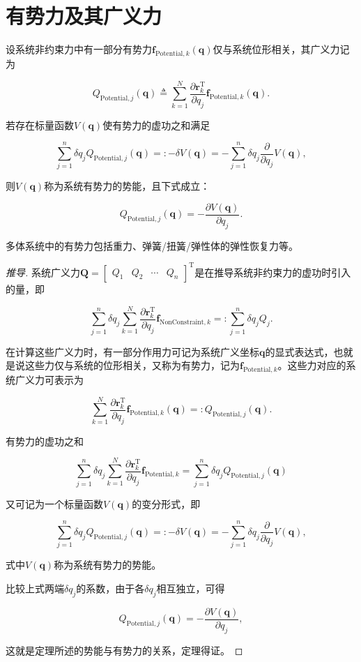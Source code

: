\section{有势力及其广义力}
\begin{theorem}[势能与有势力的关系]
设系统非约束力中有一部分有势力$\boldsymbol{f}_{\text{Potential},k}(\boldsymbol{q})$仅与系统位形相关，其广义力记为

\[
Q_{\text{Potential},j}(\boldsymbol{q}) \triangleq \sum_{k=1}^{N}\frac{\partial \boldsymbol{r}_k^{\mathrm{T}}}{\partial q_j}\boldsymbol{f}_{\text{Potential},k}(\boldsymbol{q}).
\]

若存在标量函数$V(\boldsymbol{q})$使有势力的虚功之和满足

\[
\sum_{j=1}^{n}\delta q_j Q_{\text{Potential},j}(\boldsymbol{q}) =: -\delta V(\boldsymbol{q}) = -\sum_{j=1}^{n}\delta q_j\frac{\partial}{\partial q_j}V(\boldsymbol{q}),
\]

则$V(\boldsymbol{q})$称为系统有势力的势能，且下式成立：

\[
Q_{\text{Potential},j}(\boldsymbol{q}) = -\frac{\partial V(\boldsymbol{q})}{\partial q_j}.
\]

多体系统中的有势力包括重力、弹簧/扭簧/弹性体的弹性恢复力等。
\end{theorem}
\begin{proof}[推导]
系统广义力$\boldsymbol{Q} = \begin{bmatrix}Q_1 & Q_2 & \cdots & Q_n\end{bmatrix}^{\mathrm{T}}$是在推导系统非约束力的虚功时引入的量，即

\[
\sum_{j=1}^{n}\delta q_j\sum_{k=1}^{N}\frac{\partial \boldsymbol{r}_k^{\mathrm{T}}}{\partial q_j}\boldsymbol{f}_{\text{NonConstraint},k} =: \sum_{j=1}^{n}\delta q_j Q_j.
\]

在计算这些广义力时，有一部分作用力可记为系统广义坐标$\boldsymbol{q}$的显式表达式，也就是说这些力仅与系统的位形相关，又称为有势力，记为$\boldsymbol{f}_{\text{Potential},k}$。这些力对应的系统广义力可表示为

\[
\sum_{k=1}^{N}\frac{\partial \boldsymbol{r}_k^{\mathrm{T}}}{\partial q_j}\boldsymbol{f}_{\text{Potential},k}(\boldsymbol{q}) =: Q_{\text{Potential},j}(\boldsymbol{q}).
\]

有势力的虚功之和

\[
\sum_{j=1}^{n}\delta q_j\sum_{k=1}^{N}\frac{\partial \boldsymbol{r}_k^{\mathrm{T}}}{\partial q_j}\boldsymbol{f}_{\text{Potential},k} = \sum_{j=1}^{n}\delta q_j Q_{\text{Potential},j}(\boldsymbol{q})
\]

又可记为一个标量函数$V(\boldsymbol{q})$的变分形式，即

\[
\sum_{j=1}^{n}\delta q_j Q_{\text{Potential},j}(\boldsymbol{q}) =: -\delta V(\boldsymbol{q}) = -\sum_{j=1}^{n}\delta q_j\frac{\partial}{\partial q_j}V(\boldsymbol{q}),
\]

式中$V(\boldsymbol{q})$称为系统有势力的势能。

比较上式两端$\delta q_j$的系数，由于各$\delta q_j$相互独立，可得

\[
Q_{\text{Potential},j}(\boldsymbol{q}) = -\frac{\partial V(\boldsymbol{q})}{\partial q_j},
\]

这就是定理所述的势能与有势力的关系，定理得证。
\end{proof}
